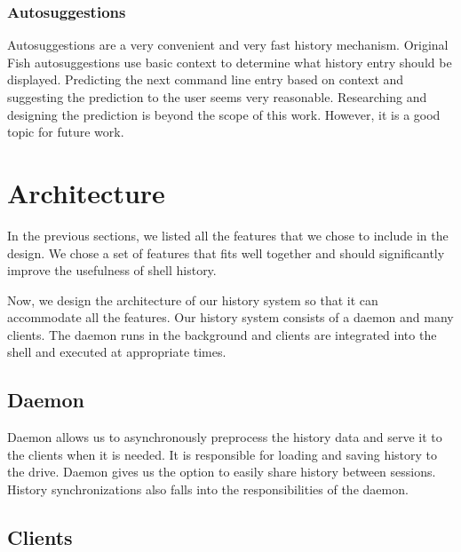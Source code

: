 \documentclass[thesis=M,english]{FITthesis}[2012/10/20]
\begin{document}



\subsubsection{Autosuggestions}

Autosuggestions are a very convenient and very fast history mechanism. Original Fish autosuggestions use basic context to determine what history entry should be displayed. Predicting the next command line entry based on context and suggesting the prediction to the user seems very reasonable.
Researching and designing the prediction is beyond the scope of this work. However, it is a good topic for future work.


\section{Architecture}

In the previous sections, we listed all the features that we chose to include in the design. We chose a set of features that fits well together and should significantly improve the usefulness of shell history.

Now, we design the architecture of our history system so that it can accommodate all the features. 
Our history system consists of a daemon and many clients. The daemon runs in the background and clients are integrated into the shell and executed at appropriate times.  

\subsection{Daemon}

Daemon allows us to asynchronously preprocess the history data and serve it to the clients when it is needed. It is responsible for loading and saving history to the drive. Daemon gives us the option to easily share history between sessions. History synchronizations also falls into the responsibilities of the daemon.

\subsection{Clients}
\end{document}
